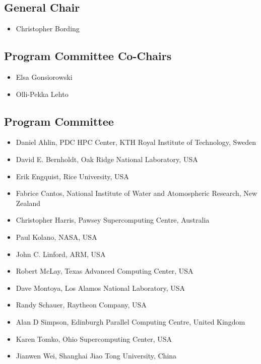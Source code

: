 \documentclass[11pt,a4paper]{article}
\begin{document}
\subsection{General Chair}
\begin{itemize}
\item Christopher Bording
\end{itemize}
\subsection{Program Committee Co-Chairs}

\begin{itemize}
\item Elsa Gonsiorowski
\item Olli-Pekka Lehto
\end{itemize}

\subsection{Program Committee}

\begin{itemize}
\item Daniel Ahlin, PDC HPC Center, KTH Royal Institute of Technology, Sweden
\item David E. Bernholdt, Oak Ridge National Laboratory, USA
\item Erik Engquist, Rice University, USA
\item Fabrice Cantos, National Institute of Water and Atomospheric Research, New Zealand
\item Christopher Harris, Pawsey Supercomputing Centre, Australia
\item Paul Kolano, NASA, USA
\item John C. Linford, ARM, USA
\item Robert McLay, Texas Advanced Computing Center, USA
\item Dave Montoya, Los Alamos National Laboratory, USA
\item Randy Schauer, Raytheon Company, USA
\item Alan D Simpson, Edinburgh Parallel Computing Centre, United Kingdom
\item Karen Tomko, Ohio Supercomputing Center, USA
\item Jianwen Wei, Shanghai Jiao Tong University, China
\end{itemize}
\end{document}
